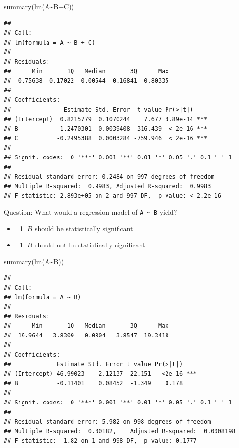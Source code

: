\documentclass[
]{article}
\newenvironment{Shaded}{\begin{snugshade}}{\end{snugshade}}
\newcommand{\FunctionTok}[1]{\textcolor[rgb]{0.00,0.00,0.00}{#1}}
\newcommand{\NormalTok}[1]{#1}
\newcommand{\SpecialCharTok}[1]{\textcolor[rgb]{0.00,0.00,0.00}{#1}}
\providecommand{\tightlist}{%
  \setlength{\itemsep}{0pt}\setlength{\parskip}{0pt}}
\begin{document}
\begin{Shaded}
\begin{Highlighting}[]
\FunctionTok{summary}\NormalTok{(}\FunctionTok{lm}\NormalTok{(A}\SpecialCharTok{\textasciitilde{}}\NormalTok{B}\SpecialCharTok{+}\NormalTok{C))}
\end{Highlighting}
\end{Shaded}

\begin{verbatim}
## 
## Call:
## lm(formula = A ~ B + C)
## 
## Residuals:
##      Min       1Q   Median       3Q      Max 
## -0.75638 -0.17022  0.00544  0.16841  0.80335 
## 
## Coefficients:
##               Estimate Std. Error  t value Pr(>|t|)    
## (Intercept)  0.8215779  0.1070244    7.677 3.89e-14 ***
## B            1.2470301  0.0039408  316.439  < 2e-16 ***
## C           -0.2495388  0.0003284 -759.946  < 2e-16 ***
## ---
## Signif. codes:  0 '***' 0.001 '**' 0.01 '*' 0.05 '.' 0.1 ' ' 1
## 
## Residual standard error: 0.2484 on 997 degrees of freedom
## Multiple R-squared:  0.9983, Adjusted R-squared:  0.9983 
## F-statistic: 2.893e+05 on 2 and 997 DF,  p-value: < 2.2e-16
\end{verbatim}

Question: What would a regression model of
\texttt{A\ \textasciitilde{}\ B} yield?

\begin{itemize}
\item
  \begin{enumerate}
  \def\labelenumi{\alph{enumi})}
  \tightlist
  \item
    \(B\) should be statistically significant
  \end{enumerate}
\item
  \begin{enumerate}
  \def\labelenumi{\alph{enumi})}
  \setcounter{enumi}{1}
  \tightlist
  \item
    \(B\) should not be statistically significant
  \end{enumerate}
\end{itemize}

\begin{Shaded}
\begin{Highlighting}[]
\FunctionTok{summary}\NormalTok{(}\FunctionTok{lm}\NormalTok{(A}\SpecialCharTok{\textasciitilde{}}\NormalTok{B))}
\end{Highlighting}
\end{Shaded}

\begin{verbatim}
## 
## Call:
## lm(formula = A ~ B)
## 
## Residuals:
##      Min       1Q   Median       3Q      Max 
## -19.9644  -3.8309  -0.0804   3.8547  19.3418 
## 
## Coefficients:
##             Estimate Std. Error t value Pr(>|t|)    
## (Intercept) 46.99023    2.12137  22.151   <2e-16 ***
## B           -0.11401    0.08452  -1.349    0.178    
## ---
## Signif. codes:  0 '***' 0.001 '**' 0.01 '*' 0.05 '.' 0.1 ' ' 1
## 
## Residual standard error: 5.982 on 998 degrees of freedom
## Multiple R-squared:  0.00182,    Adjusted R-squared:  0.0008198 
## F-statistic:  1.82 on 1 and 998 DF,  p-value: 0.1777
\end{verbatim}
\end{document}
